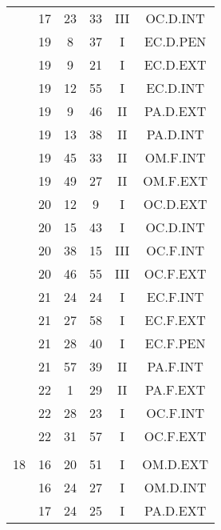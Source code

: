 \documentclass[12pt, a4paper]{article}
\begin{document}
\begin{multicols}{3}
{\begin{tabular}{c c c c c c}
	 	 	 	 & 17 & 23 & 33 & III & OC.D.INT\\%
	 	 	 	 & 19 & 8 & 37 & I & EC.D.PEN\\%
	 	 	 	 & 19 & 9 & 21 & I & EC.D.EXT\\%
	 	 	 	 & 19 & 12 & 55 & I & EC.D.INT\\%
	 	 	 	 & 19 & 9 & 46 & II & PA.D.EXT\\%
	 	 	 	 & 19 & 13 & 38 & II & PA.D.INT\\%
	 	 	 	 & 19 & 45 & 33 & II & OM.F.INT\\%
	 	 	 	 & 19 & 49 & 27 & II & OM.F.EXT\\%
	 	 	 	 & 20 & 12 & 9 & I & OC.D.EXT\\%
	 	 	 	 & 20 & 15 & 43 & I & OC.D.INT\\%
	 	 	 	 & 20 & 38 & 15 & III & OC.F.INT\\%
	 	 	 	 & 20 & 46 & 55 & III & OC.F.EXT\\%
	 	 	 	 & 21 & 24 & 24 & I & EC.F.INT\\%
	 	 	 	 & 21 & 27 & 58 & I & EC.F.EXT\\%
	 	 	 	 & 21 & 28 & 40 & I & EC.F.PEN\\%
	 	 	 	 & 21 & 57 & 39 & II & PA.F.INT\\%
	 	 	 	 & 22 & 1 & 29 & II & PA.F.EXT\\%
	 	 	 	 & 22 & 28 & 23 & I & OC.F.INT\\%
	 	 	 	 & 22 & 31 & 57 & I & OC.F.EXT\\%
	 	 	 	 & & & & & \\%
	 	 	 	18 & 16 & 20 & 51 & I & OM.D.EXT\\%
	 	 	 	 & 16 & 24 & 27 & I & OM.D.INT\\%
	 	 	 	 & 17 & 24 & 25 & I & PA.D.EXT\\%

\end{tabular}}
\end{multicols}
\end{document}
